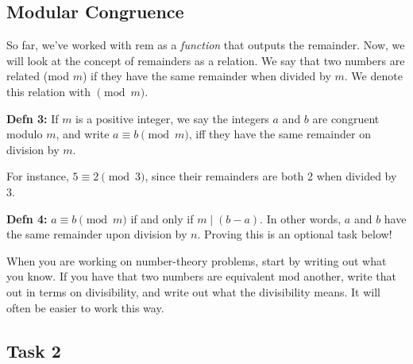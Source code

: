 \documentclass[12pt,letterpaper]{article}
\begin{document}
	\subsection*{Modular Congruence}
	
	So far, we've worked with rem as a \textit{function} that outputs the remainder. Now, we will look at the concept of remainders as a relation. We say that two numbers are related (mod $m$) if they have the same remainder when divided by $m$. We denote this relation with $\pmod m$.

    \textbf{Defn 3:} If $m$ is a positive integer, we say the integers $a$ and $b$ are congruent modulo $m$, and write $a \equiv b \pmod m$, iff they have the same remainder on division by $m$.
    
    For instance, $5 \equiv 2 \pmod 3$, since their remainders are both 2 when divided by 3.
    
	\textbf{Defn 4:} $a \equiv b \pmod m$ if and only if $m \mid (b-a)$. In other words, $a$ and $b$ have the same remainder upon division by $n$. Proving this is an optional task below!
	
	When you are working on number-theory problems, start by writing out what you know. If you have that two numbers are equivalent mod another, write that out in terms on divisibility, and write out what the divisibility means. It will often be easier to work this way.
	
	\subsection*{Task 2}
	
\end{document}
